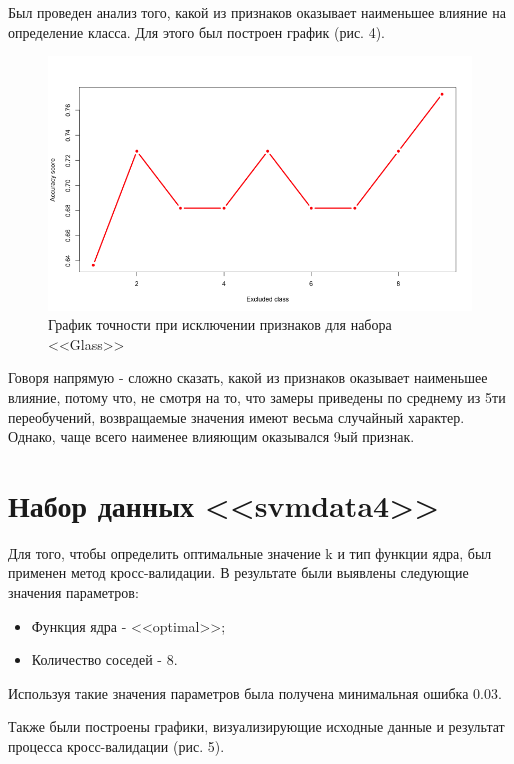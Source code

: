 \documentclass[]{article}
\numberwithin{equation}{section}
\begin{document}
        Был проведен анализ того, какой из признаков оказывает наименьшее влияние на определение класса. Для этого был построен график (рис. 4).

        \begin{figure}[H]
            \centering
            \includegraphics[width = 1.0\linewidth]{data/glass_class_exclude.png}
            \caption{График точности при исключении признаков для набора <<Glass>>}
        \end{figure}

        Говоря напрямую - сложно сказать, какой из признаков оказывает наименьшее влияние, потому что, не смотря на то, что замеры приведены по среднему из 5ти переобучений, возвращаемые значения имеют весьма случайный характер. Однако, чаще всего наименее влияющим оказывался 9ый признак.

    \section{Набор данных <<svmdata4>>}
        Для того, чтобы определить оптимальные значение k и тип функции ядра, был применен метод кросс-валидации. В результате были выявлены следующие значения параметров:
            \begin{itemize}
                \item Функция ядра - <<optimal>>;
                \item Количество соседей - 8.
            \end{itemize}

        Используя такие значения параметров была получена минимальная ошибка 0.03.

        Также были построены графики, визуализирующие исходные данные и результат процесса кросс-валидации (рис. 5).
\end{document}
